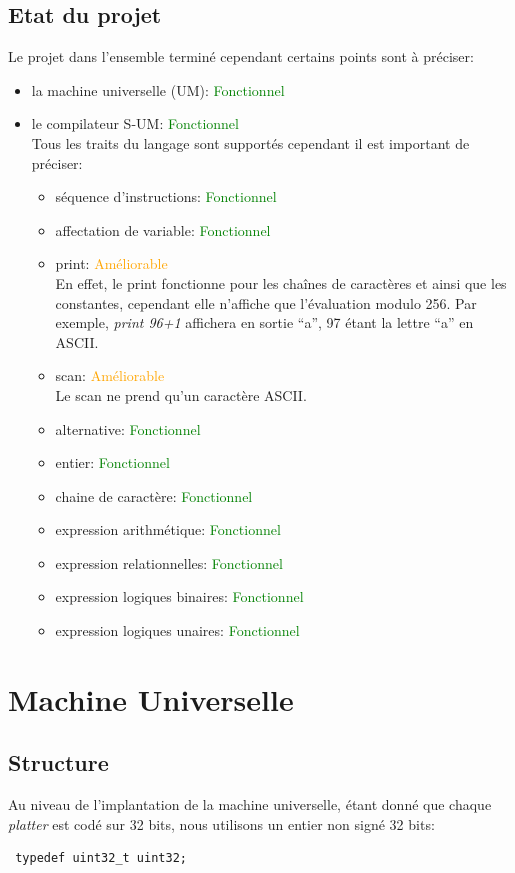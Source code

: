 \documentclass[a4paper,12pt]{report}
\begin{document}
\section{Etat du projet}
Le projet dans l'ensemble terminé cependant certains points sont à préciser:
\begin{itemize}
 \item la machine universelle (UM): \textcolor{green}{Fonctionnel}
 \item le compilateur S-UM: \textcolor{green}{Fonctionnel}
 \\ Tous les traits du langage sont supportés cependant il est important de préciser:
 \begin{itemize}
  \item séquence d'instructions: \textcolor{green}{Fonctionnel}
  \item affectation de variable: \textcolor{green}{Fonctionnel}
  \item print: \textcolor{orange}{Améliorable}
  \\ En effet, le print fonctionne pour les chaînes de caractères et ainsi que les constantes, cependant elle n'affiche que l'évaluation
  modulo 256. Par exemple, \textit{print 96+1} affichera en sortie ``a'', 97 étant la lettre ``a'' en ASCII.
  \item scan: \textcolor{orange}{Améliorable}
  \\Le scan ne prend qu'un caractère ASCII.
  \item alternative: \textcolor{green}{Fonctionnel}
  \item entier: \textcolor{green}{Fonctionnel}
  \item chaine de caractère: \textcolor{green}{Fonctionnel}
  \item expression arithmétique: \textcolor{green}{Fonctionnel}
  \item expression relationnelles: \textcolor{green}{Fonctionnel}
  \item expression logiques binaires: \textcolor{green}{Fonctionnel}
  \item expression logiques unaires: \textcolor{green}{Fonctionnel}
 \end{itemize}
\end{itemize}


\chapter{Machine Universelle}
\section{Structure}
Au niveau de l'implantation de la machine universelle, étant donné que chaque \textit{platter} est codé sur 32 bits, nous utilisons
un entier non signé 32 bits:
\begin{verbatim}
 typedef uint32_t uint32;
\end{verbatim}
\end{document}
